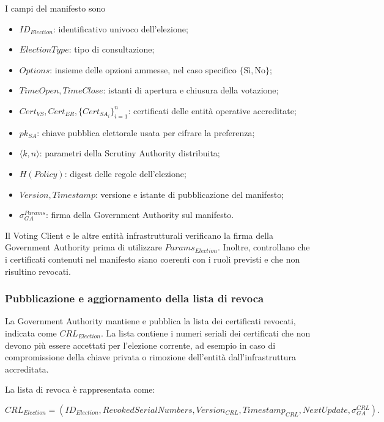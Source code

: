 \documentclass[a4paper,12pt]{article}
\begin{document}
I campi del manifesto sono

\begin{itemize}
	\item \(ID_{Election}\): identificativo univoco dell'elezione;
	\item \(ElectionType\): tipo di consultazione;
	\item \(Options\): insieme delle opzioni ammesse, nel caso specifico \(\{\text{S\`i}, \text{No}\}\);
	\item \(TimeOpen, TimeClose\): istanti di apertura e chiusura della votazione;
	\item \(Cert_{VS}, Cert_{ER}, \{Cert_{SA_i}\}_{i=1}^{n}\): certificati delle entit\`a operative accreditate;
	\item \(pk_{SA}\): chiave pubblica elettorale usata per cifrare la preferenza;
	\item \(\langle k,n\rangle\): parametri della Scrutiny Authority distribuita;
	\item \(H(Policy)\): digest delle regole dell'elezione;
	\item \(Version, Timestamp\): versione e istante di pubblicazione del manifesto;
	\item \(\sigma_{GA}^{Params}\): firma della Government Authority sul manifesto.
\end{itemize}

Il Voting Client e le altre entit\`a infrastrutturali verificano la firma della Government Authority prima di utilizzare \(Params_{Election}\). 
Inoltre, controllano che i certificati contenuti nel manifesto siano coerenti con i ruoli previsti e che non risultino revocati.

\subsubsection{Pubblicazione e aggiornamento della lista di revoca}

La Government Authority mantiene e pubblica la lista dei certificati revocati, indicata come \(CRL_{Election}\). 
La lista contiene i numeri seriali dei certificati che non devono pi\`u essere accettati per l'elezione corrente, ad esempio in caso di compromissione della chiave privata o rimozione dell'entit\`a dall'infrastruttura accreditata.

La lista di revoca \`e rappresentata come:

\[
	CRL_{Election} =
	(ID_{Election}, RevokedSerialNumbers, Version_{CRL}, Timestamp_{CRL}, NextUpdate, \sigma_{GA}^{CRL}).
\]
\end{document}
